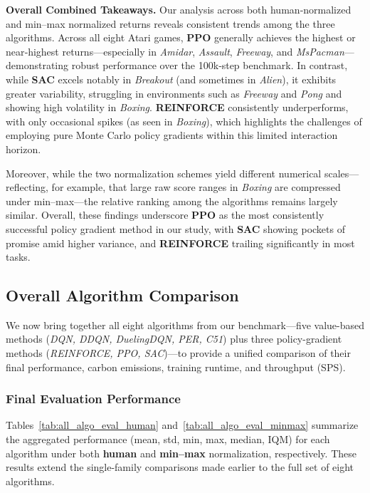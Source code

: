 \noindent
\textbf{Overall Combined Takeaways.}
Our analysis across both human‐normalized and min--max normalized returns reveals consistent trends among the three algorithms. Across all eight Atari games, \textbf{PPO} generally achieves the highest or near‐highest returns—especially in \emph{Amidar}, \emph{Assault}, \emph{Freeway}, and \emph{MsPacman}—demonstrating robust performance over the 100k‐step benchmark. In contrast, while \textbf{SAC} excels notably in \emph{Breakout} (and sometimes in \emph{Alien}), it exhibits greater variability, struggling in environments such as \emph{Freeway} and \emph{Pong} and showing high volatility in \emph{Boxing}. \textbf{REINFORCE} consistently underperforms, with only occasional spikes (as seen in \emph{Boxing}), which highlights the challenges of employing pure Monte Carlo policy gradients within this limited interaction horizon.

Moreover, while the two normalization schemes yield different numerical scales—reflecting, for example, that large raw score ranges in \emph{Boxing} are compressed under min--max—the relative ranking among the algorithms remains largely similar. Overall, these findings underscore \textbf{PPO} as the most consistently successful policy gradient method in our study, with \textbf{SAC} showing pockets of promise amid higher variance, and \textbf{REINFORCE} trailing significantly in most tasks.


\subsection{Overall Algorithm Comparison}
\label{subsec:overall_algo_comparison}

We now bring together all eight algorithms from our benchmark—five value-based methods 
(\emph{DQN, DDQN, DuelingDQN, PER, C51}) plus three policy-gradient methods 
(\emph{REINFORCE, PPO, SAC})—to provide a unified comparison of their final performance, 
carbon emissions, training runtime, and throughput (SPS).

\subsubsection{Final Evaluation Performance}

Tables~\ref{tab:all_algo_eval_human} and~\vref{tab:all_algo_eval_minmax} summarize the 
aggregated performance (mean, std, min, max, median, IQM) for each algorithm under both 
\textbf{human} and \textbf{min--max} normalization, respectively. These results extend 
the single-family comparisons made earlier to the full set of eight algorithms.

